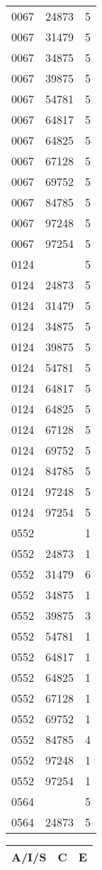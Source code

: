 {{\begin{tabular}{|c|c||c|}
        \hline
0067&24873&5\\ 0067&31479&5\\ 0067&34875&5\\ 0067&39875&5\\ 0067&54781&5\\ 0067&64817&5\\ 0067&64825&5\\ 0067&67128&5\\ 0067&69752&5\\ 0067&84785&5\\ 0067&97248&5\\ 0067&97254&5\\ 0124& &5\\ 0124&24873&5\\ 0124&31479&5\\ 0124&34875&5\\ 0124&39875&5\\ 0124&54781&5\\ 0124&64817&5\\ 0124&64825&5\\ 0124&67128&5\\ 0124&69752&5\\ 0124&84785&5\\ 0124&97248&5\\ 0124&97254&5\\ 0552& &1\\ 0552&24873&1\\ 0552&31479&6\\ 0552&34875&1\\ 0552&39875&3\\ 0552&54781&1\\ 0552&64817&1\\ 0552&64825&1\\ 0552&67128&1\\ 0552&69752&1\\ 0552&84785&4\\ 0552&97248&1\\ 0552&97254&1\\ 0564& &5\\ 0564&24873&5\\ 
        \hline
        \end{tabular}
        \quad
        \begin{tabular}{|c|c||c|}
        \hline
        \bf A/I/S & \bf C & \bf E \\
        \hline

\end{tabular}}}
